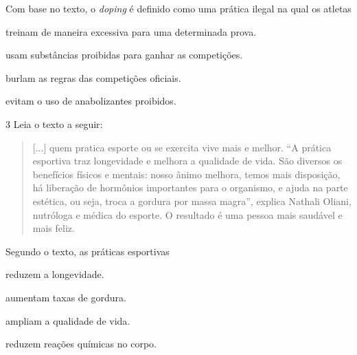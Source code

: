 Com base no texto, o \textit{doping} é definido como uma prática ilegal 
na qual os atletas

\begin{escolha}
\item treinam de maneira excessiva para uma determinada prova.

\item usam substâncias proibidas para ganhar as competições.

\item burlam as regras das competições oficiais.

\item evitam o uso de anabolizantes proibidos.
\end{escolha}

\num{3}  Leia o texto a seguir:

\begin{quote}
{[}...{]} quem pratica esporte ou se exercita vive mais e melhor. ``A
prática esportiva traz longevidade e melhora a qualidade de vida. São
diversos os benefícios físicos e mentais: nosso ânimo melhora, temos
mais disposição, há liberação de hormônios importantes para o organismo,
e ajuda na parte estética, ou seja, troca a gordura por massa magra'',
explica Nathali Oliani, nutróloga e médica do esporte. O resultado é 
uma pessoa mais saudável e mais feliz.

\end{quote}


Segundo o texto, as práticas esportivas  

\begin{escolha}
\item reduzem a longevidade.

\item aumentam taxas de gordura.

\item ampliam a qualidade de vida.

\item reduzem reações químicas no corpo.
\end{escolha}


